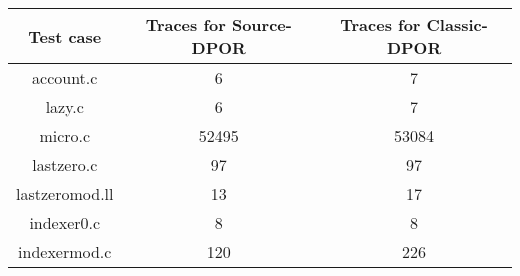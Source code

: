 \begin{center}
\begin{tabular}{ |c|c|c| }
\hline
Test case & Traces for Source-DPOR & Traces for Classic-DPOR \\
\hline \hline
account.c & 6 & 7\\
\hline
lazy.c & 6 & 7\\
\hline
micro.c & 52495 & 53084\\
\hline
lastzero.c & 97 & 97\\
\hline
lastzeromod.ll & 13 & 17\\
\hline
indexer0.c & 8 & 8\\
\hline
indexermod.c & 120 & 226\\
\hline
\end{tabular}
\end{center}
